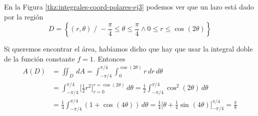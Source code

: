 \documentclass[12pt]{article}
\begin{document}
En la Figura \ref{tkz:integrales-coord-polares-ej3} podemos ver que un lazo está dado por la región
\[
  D=\left\{(r,\theta) \;/\; -\frac{\pi}{4}\leq \theta\leq \frac{\pi}{4} \land 0\leq r\leq \cos^{}(2\theta)\right\}
\]

Si queremos encontrar el área, habíamos dicho que hay que usar la integral doble de la función constante $ f=1 $. Entonces
\begin{align*}
  A(D) &= \iint_{D}  \,dA=\int_{-\pi/4}^{\pi/4} \int_{0}^{\cos^{}(2\theta)} r \,dr\,d\theta\\
   &= \int_{-\pi/4}^{\pi/4} \Bigg[\frac{1}{2}r^2\Bigg]_{r=0}^{r=\cos^{}(2\theta)} \,d\theta=\frac{1}{2}\int_{-\pi/4}^{\pi/4} \cos^{2}(2\theta) \,d\theta\\
   &= \frac{1}{4}\int_{-\pi/4}^{\pi/4} \left(1+\cos^{}(4\theta)\right) \,d\theta = \frac{1}{4}\Bigg[\theta+\frac{1}{4}\sin^{}(4\theta)\Bigg]_{-\pi/4}^{\pi/4}=\frac{\pi}{8}
\end{align*}


\newpage
{}
\printbibliography
\end{document}
